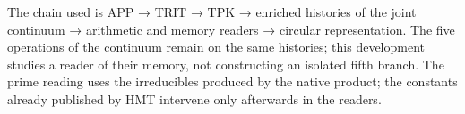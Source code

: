 % 
% 
% 
The chain used is APP → TRIT → TPK → enriched histories of the joint continuum → arithmetic and memory readers → circular representation. The five operations of the continuum remain on the same histories; this development studies a reader of their memory, not constructing an isolated fifth branch. The prime reading uses the irreducibles produced by the native product; the constants already published by HMT intervene only afterwards in the readers.

